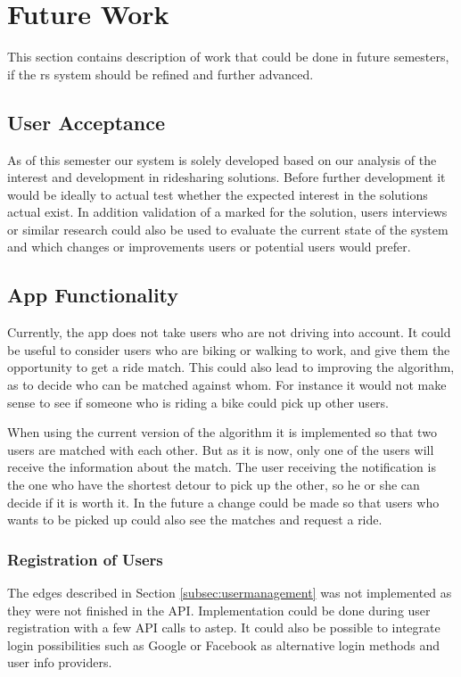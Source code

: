 \section{Future Work}\label{sec:future}
This section contains description of work that could be done in future semesters, if the \gls{rs} system should be refined and further advanced.

\subsection{User Acceptance}
As of this semester our system is solely developed based on our analysis of the interest and development in ridesharing solutions.
Before further development it would be ideally to actual test whether the expected interest in the solutions actual exist.
In addition validation of a marked for the solution, users interviews or similar research could also be used to evaluate the current state of the system and which changes or improvements users or potential users would prefer.

\subsection{App Functionality}
Currently, the app does not take users who are not driving into account.
It could be useful to consider users who are biking or walking to work, and give them the opportunity to get a ride match.
This could also lead to improving the algorithm, as to decide who can be matched against whom.
For instance it would not make sense to see if someone who is riding a bike could pick up other users.

When using the current version of the algorithm it is implemented so that two users are matched with each other.
But as it is now, only one of the users will receive the information about the match.
The user receiving the notification is the one who have the shortest detour to pick up the other, so he or she can decide if it is worth it. 
In the future a change could be made so that users who wants to be picked up could also see the matches and request a ride.

\subsubsection*{Registration of Users}
The edges described in Section \ref{subsec:usermanagement} was not implemented as they were not finished in the API.
Implementation could be done during user registration with a few API calls to \gls{astep}.
It could also be possible to integrate login possibilities such as Google or Facebook as alternative login methods and user info providers.

